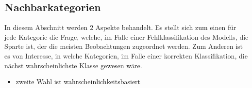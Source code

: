 \documentclass[a4paper,11pt]{article}
\begin{document}
\subsection{Nachbarkategorien}

In diesem Abschnitt werden $2$ Aspekte behandelt. Es stellt sich zum einen für jede Kategorie die Frage, welche, im Falle einer Fehlklassifikation des Modells, die Sparte ist, der die meisten Beobachtungen zugeordnet werden. Zum Anderen ist es von Interesse, in welche Kategorien, im Falle einer korrekten Klassifikation, die nächst wahrscheinlichste Klasse gewesen wäre.


\begin{itemize}
    \item zweite Wahl ist wahrscheinlichkeitsbasiert
\end{itemize}{}
\end{document}
